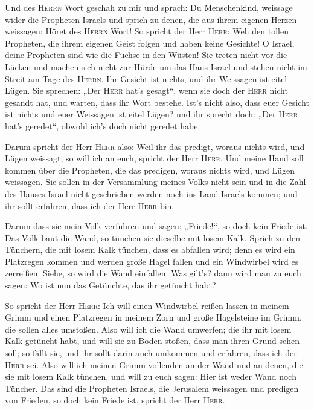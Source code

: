  Und des \textsc{Herrn} Wort geschah zu mir und sprach:
 Du Menschenkind, weissage wider die Propheten Israels und
sprich zu denen, die aus ihrem eigenen Herzen weissagen: Höret des
\textsc{Herrn} Wort!  So spricht der Herr \textsc{Herr}:
Weh den tollen Propheten, die ihrem eigenen Geist folgen und haben keine
Gesichte!  O Israel, deine Propheten sind wie die Füchse
in den Wüsten!  Sie treten nicht vor die Lücken und machen
sich nicht zur Hürde um das Haus Israel und stehen nicht im Streit am
Tage des \textsc{Herrn}.  Ihr Gesicht ist nichts, und ihr
Weissagen ist eitel Lügen. Sie sprechen: „Der \textsc{Herr} hat's
gesagt``, wenn sie doch der \textsc{Herr} nicht gesandt hat, und warten,
dass ihr Wort bestehe.  Ist's nicht also, dass euer
Gesicht ist nichts und euer Weissagen ist eitel Lügen? und ihr sprecht
doch: „Der \textsc{Herr} hat's geredet``, obwohl ich's doch nicht
geredet habe.

 Darum spricht der Herr \textsc{Herr} also: Weil ihr das
predigt, woraus nichts wird, und Lügen weissagt, so will ich an euch,
spricht der Herr \textsc{Herr}.  Und meine Hand soll
kommen über die Propheten, die das predigen, woraus nichts wird, und
Lügen weissagen. Sie sollen in der Versammlung meines Volks nicht sein
und in die Zahl des Hauses Israel nicht geschrieben werden noch ins Land
Israels kommen; und ihr sollt erfahren, dass ich der Herr \textsc{Herr}
bin.

 Darum dass sie mein Volk verführen und sagen:
„Friede!{}``, so doch kein Friede ist. Das Volk baut die Wand, so
tünchen sie dieselbe mit losem Kalk.  Sprich zu den
Tünchern, die mit losem Kalk tünchen, dass es abfallen wird; denn es
wird ein Platzregen kommen und werden große Hagel fallen und ein
Windwirbel wird es zerreißen.  Siehe, so wird die Wand
einfallen. Was gilt's? dann wird man zu euch sagen: Wo ist nun das
Getünchte, das ihr getüncht habt?

 So spricht der Herr \textsc{Herr}: Ich will einen
Windwirbel reißen lassen in meinem Grimm und einen Platzregen in meinem
Zorn und große Hagelsteine im Grimm, die sollen alles umstoßen.
 Also will ich die Wand umwerfen; die ihr mit losem Kalk
getüncht habt, und will sie zu Boden stoßen, dass man ihren Grund sehen
soll; so fällt sie, und ihr sollt darin auch umkommen und erfahren, dass
ich der \textsc{Herr} sei.  Also will ich meinen Grimm
vollenden an der Wand und an denen, die sie mit losem Kalk tünchen, und
will zu euch sagen: Hier ist weder Wand noch Tüncher. 
Das sind die Propheten Israels, die Jerusalem weissagen und predigen von
Frieden, so doch kein Friede ist, spricht der Herr \textsc{Herr}.

